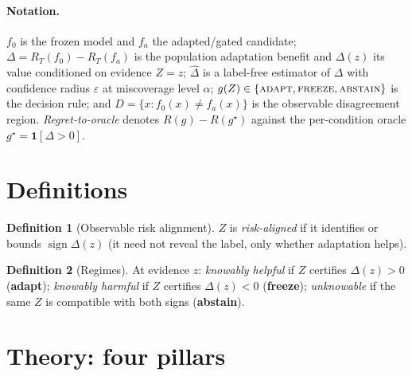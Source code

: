 \documentclass[conference]{IEEEtran}
\theoremstyle{plain}
\theoremstyle{definition}
\newtheorem{definition}{Definition}
\newcommand{\sign}{\operatorname{sign}}
\begin{document}
\paragraph{Notation.} $f_0$ is the frozen model and $f_a$ the adapted/gated candidate;
$\Delta=R_T(f_0)-R_T(f_a)$ is the population adaptation benefit and $\Delta(z)$ its value
conditioned on evidence $Z{=}z$; $\widehat\Delta$ is a label-free estimator of $\Delta$ with
confidence radius $\varepsilon$ at miscoverage level $\alpha$; $g(Z)\in\{\textsc{adapt},
\textsc{freeze},\textsc{abstain}\}$ is the decision rule; and $D=\{x:f_0(x)\neq f_a(x)\}$ is the
observable disagreement region. \emph{Regret-to-oracle} denotes $R(g)-R(g^\star)$ against the
per-condition oracle $g^\star=\mathbf1[\Delta>0]$.

\section{Definitions}\label{sec:def}
\begin{definition}[Observable risk alignment]
$Z$ is \emph{risk-aligned} if it identifies or bounds $\sign\Delta(z)$ (it need not
reveal the label, only whether adaptation helps).
\end{definition}
\begin{definition}[Regimes]
At evidence $z$: \emph{knowably helpful} if $Z$ certifies $\Delta(z)>0$ (\textbf{adapt});
\emph{knowably harmful} if $Z$ certifies $\Delta(z)<0$ (\textbf{freeze});
\emph{unknowable} if the same $Z$ is compatible with both signs (\textbf{abstain}).
\end{definition}

\begin{center}\end{center}

\section{Theory: four pillars}\label{sec:theory}\label{sec:bsfrontier}\label{sec:gmeter}

\end{document}
